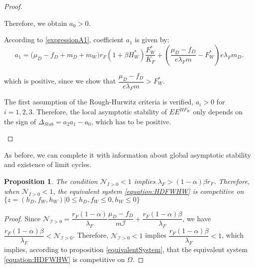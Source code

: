 \documentclass{article}
\newcommand{\lfw}{\lambda_{F}}
\newcommand{\lfw}{\lambda_{F}}
\newcommand{\cI}{\mathcal{I}}
\newtheorem{prop}{Proposition}
\begin{document}
\begin{proof}
\begin{itemize}
Therefore, we obtain $a_0 > 0$.

According to \eqref{expressionA1}, coefficient $a_1$ is given by:
\begin{equation*}
a_1 = \big( \mu_D  -f_D + m_D + m_W) r_F(1+ \beta H_W^*) \dfrac{F^*_W}{K_F} + \left(\dfrac{\mu_D -f_D}{e\lfw m} - F_W^*\right) e \lfw m_D .
\end{equation*}

which is positive, since we show that $\dfrac{\mu_D - f_D}{e \lfw m} > F^*_{W}$.

The first assumption of the Rough-Hurwitz criteria is verified, $a_i > 0$ for $i=1,2,3$. Therefore, the local asymptotic stability of $EE^{HF_W}$ only depends on the sign of $\Delta_{Stab}= a_2 a_1 - a_0$, which has to be positive.
\end{itemize}
\end{proof}

As before, we can complete it with information about global asymptotic stability and existence of limit cycles. 

\begin{prop}
The condition $\mathcal{N}_{I > 0} < 1$ implies $\lfw > (1-\alpha) \beta r_F$. Therefore, when $\mathcal{N}_{I > 0} < 1$, the equivalent system \eqref{equation:HDFWHW} is competitive on $\Big\{z = (h_D, f_W, h_W) | 0 \leq h_D, f_W  \leq 0, h_W \leq 0 \Big\}$
\end{prop}

\begin{proof}
Since $\mathcal{N}_{\cI > 0} = \dfrac{r_F(1-\alpha)}{\lfw}\dfrac{\mu_D - f_D}{m \cI} + \dfrac{r_F(1-\alpha) \beta}{\lfw}$, we have $\dfrac{r_F(1-\alpha) \beta}{\lfw} < \mathcal{N}_{\cI > 0}$. Therefore, $\mathcal{N}_{\cI > 0} < 1$ implies $\dfrac{r_F(1-\alpha) \beta}{\lfw} < 1$, which implies, according to proposition \ref{equivalentSystem}, that the equivalent system \eqref{equation:HDFWHW} is competitive on $\Omega$.
\end{proof}
\end{document}
